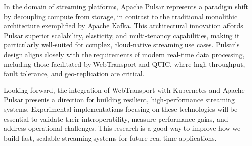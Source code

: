 In the domain of streaming platforms, Apache Pulsar represents a paradigm shift by decoupling compute from storage, in contrast to the traditional monolithic architecture exemplified by Apache Kafka. This architectural innovation affords Pulsar superior scalability, elasticity, and multi-tenancy capabilities, making it particularly well-suited for complex, cloud-native streaming use cases. Pulsar's design aligns closely with the requirements of modern real-time data processing, including those facilitated by WebTransport and QUIC, where high throughput, fault tolerance, and geo-replication are critical.

Looking forward, the integration of WebTransport with Kubernetes and Apache Pulsar presents a direction for building resilient, high-performance streaming systems. Experimental implementations focusing on these technologies will be essential to validate their interoperability, measure performance gains, and address operational challenges. This research is a good way to improve how we build fast, scalable streaming systems for future real-time applications.


